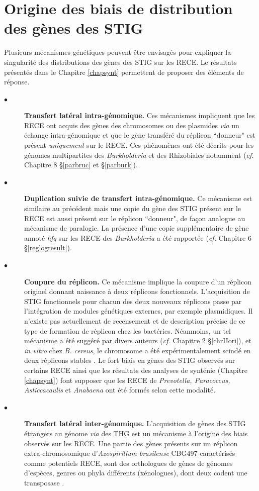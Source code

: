 \section{Origine des biais de distribution des gènes des STIG}
	Plusieurs mécanismes génétiques peuvent être envisagés pour expliquer la singularité des distributions des gènes des STIG sur les RECE. Le résultats présentés dans le Chapitre \ref{chapsynt} permettent de proposer des éléments de réponse.
\begin{description}
	\item[$\bullet$] \textbf{Transfert latéral intra-génomique.} Ces mécanismes impliquent que les RECE ont acquis des gènes des chromosomes ou des plasmides \textit{via} un échange intra-génomique et que le gène transféré du réplicon ``donneur" est présent \textit{uniquement} sur le RECE. Ces phénomènes ont été décrits pour les génomes multipartites des \textit{Burkholderia} et des Rhizobiales notamment (\textit{cf.} Chapitre 8 \S \ref{parbruc} et \S \ref{parburk}).
	\item[$\bullet$] \textbf{Duplication suivie de transfert intra-génomique.} Ce mécanisme est similaire au précédent mais une copie du gène des STIG présent sur le RECE est aussi présent sur le réplicon ``donneur", de façon analogue au mécanisme de paralogie. La présence d'une copie supplémentaire de gène annoté \textit{hfq} sur les RECE des \textit{Burkholderia} a été rapportée (\textit{cf.} Chapitre 6 \S \ref{reglogresult}).
	\item[$\bullet$] \textbf{Coupure du réplicon.} Ce mécanisme implique la coupure d'un réplicon originel donnant naissance à deux réplicons fonctionnels. L'acquisition de STIG fonctionnels pour chacun des deux nouveaux réplicons passe par l'intégration de modules génétiques externes, par exemple plasmidiques. Il n'existe pas actuellement de recensement et de description précise de ce type de formation de réplicon chez les bactéries. Néanmoins, un tel mécanisme a été suggéré par divers auteurs (\textit{cf.} Chapitre 2 \S \ref{chrIIori}), et \textit{in vitro} chez \textit{B. cereus}, le chromosome a été expérimentalement scindé en deux réplicons stables \citep{itaya1997experimental}. Le fort biais en gènes des STIG observés sur certains RECE ainsi que les résultats des analyses de synténie (Chapitre \ref{chapsynt}) font supposer que les RECE de \textit{Prevotella, Paracoccus, Asticcacaulis} et \textit{Anabaena} ont été formés selon cette modalité.
	\item[$\bullet$] \textbf{Transfert latéral inter-génomique.} L'acquisition de gènes des STIG étrangers au génome \textit{via} des THG est un mécanisme à l'origine des biais observés sur les RECE. Une partie des gènes présents sur un réplicon extra-chromosomique  d'\textit{Azospirillum brasilense} CBG497 caractérisés comme potentiels RECE,  sont des orthologues de gènes de génomes d'espèces, genres ou phyla différents (xénologues), dont deux codent une transposase \citep{Acosta-Cruz2012}.

\end{description}

